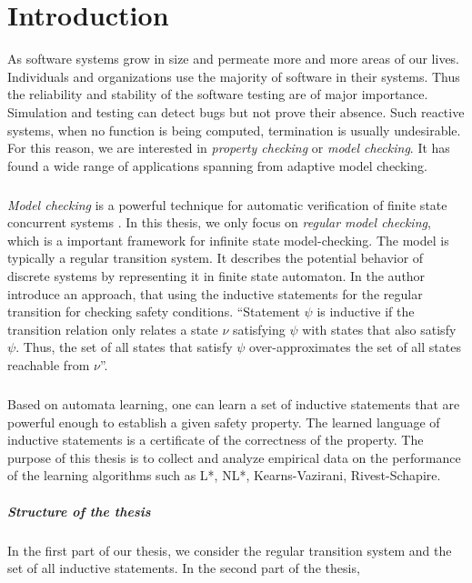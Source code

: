 
\chapter{Introduction}\label{chapter:introduction}
As software systems grow in size and permeate more and more areas of our lives.
Individuals and organizations use the majority of software in their systems. Thus the 
reliability and stability of the software testing are of major importance. Simulation 
and testing can detect bugs but not prove their absence. Such reactive 
systems, when no function is being computed, termination is usually undesirable. For 
this reason, we are interested in \textit{property checking} or \textit{model checking}. 
It has found a wide range of applications spanning from adaptive model checking.
\paragraph*{}
\textit{Model checking} is a powerful technique for automatic verification of finite state 
concurrent systems \cite{clarke2009model}. 
In this thesis, we only focus on \textit{regular model checking}, which is a important 
framework for infinite state model-checking. The model is typically a regular 
transition system. It describes the potential behavior of discrete systems by representing 
it in finite state automaton. In \cite{clarke2009model} the author introduce an approach, 
that using the inductive statements for the regular transition for checking 
safety conditions. ``Statement $\psi$ is inductive if the transition relation only relates 
a state $\nu$ satisfying $\psi$ with states that also satisfy $\psi$. Thus, the set of 
all states that satisfy $\psi$ over-approximates the set of all states reachable from $\nu$''.

\paragraph*{}
Based on automata learning, one can learn a set of inductive statements that are powerful 
enough to establish a given safety property.
The learned language of inductive statements is a certificate of the correctness of the 
property. The purpose of this thesis is to collect and analyze empirical data on 
the performance of the learning algorithms such as L*, NL*, Kearns-Vazirani, Rivest-Schapire.


\paragraph*{Structure of the thesis}
\paragraph*{}

In the first part of our thesis, we consider the regular transition system and 
the set of all inductive statements. In the second part of the thesis,